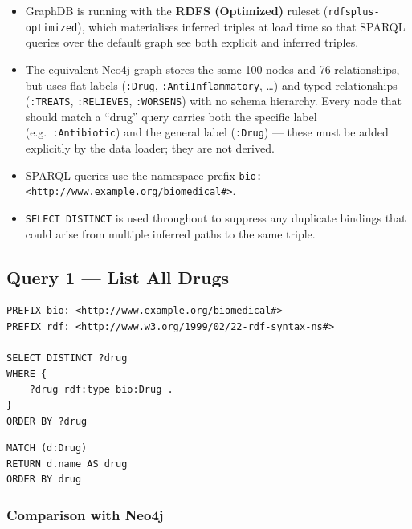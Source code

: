 \documentclass[11pt,a4paper]{article}
\begin{document}
\begin{itemize}[noitemsep]
  \item GraphDB is running with the \textbf{RDFS (Optimized)} ruleset
        (\texttt{rdfsplus-optimized}), which materialises inferred triples at
        load time so that SPARQL queries over the default graph see both
        explicit and inferred triples.
  \item The equivalent Neo4j graph stores the same 100 nodes and 76
        relationships, but uses flat labels (\texttt{:Drug},
        \texttt{:AntiInflammatory}, \ldots) and typed relationships
        (\texttt{:TREATS}, \texttt{:RELIEVES}, \texttt{:WORSENS}) with no
        schema hierarchy.  Every node that should match a ``drug'' query carries
        both the specific label (e.g.\ \texttt{:Antibiotic}) and the general
        label (\texttt{:Drug}) — these must be added explicitly by the data
        loader; they are not derived.
  \item SPARQL queries use the namespace prefix
        \texttt{bio: <http://www.example.org/biomedical\#>}.
  \item \texttt{SELECT DISTINCT} is used throughout to suppress any duplicate
        bindings that could arise from multiple inferred paths to the same triple.
\end{itemize}

\subsection{Query 1 — List All Drugs}

\begin{lstlisting}[style=sparql, caption={SPARQL: list all drugs.}]
PREFIX bio: <http://www.example.org/biomedical#>
PREFIX rdf: <http://www.w3.org/1999/02/22-rdf-syntax-ns#>

SELECT DISTINCT ?drug
WHERE {
    ?drug rdf:type bio:Drug .
}
ORDER BY ?drug
\end{lstlisting}

\begin{lstlisting}[style=cypher, caption={Cypher equivalent: list all drugs.}]
MATCH (d:Drug)
RETURN d.name AS drug
ORDER BY drug
\end{lstlisting}

\subsubsection*{Comparison with Neo4j}
\end{document}
